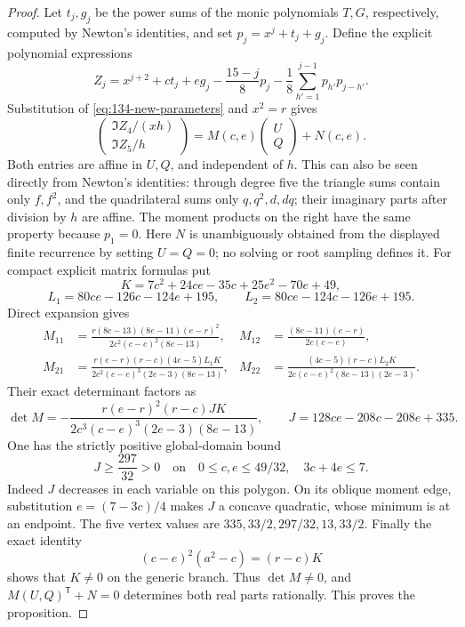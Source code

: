 \documentclass[11pt,a4paper]{article}
\theoremstyle{remark}
\begin{document}
\begin{proof}
Let \(t_j,g_j\) be the power sums of the monic polynomials \(T,G\),
respectively, computed by Newton's identities, and set
\(p_j=x^j+t_j+g_j\). Define the explicit polynomial expressions
\[
 Z_j=x^{j+2}+ct_j+eg_j-\frac{15-j}{8}p_j
                  -\frac18\sum_{h'=1}^{j-1}p_{h'}p_{j-h'}.
\]
Substitution of \eqref{eq:134-new-parameters} and \(x^2=r\) gives
\[
 \begin{pmatrix}\Im Z_4/(xh)\\\Im Z_5/h\end{pmatrix}
       =M(c,e)\begin{pmatrix}U\\Q\end{pmatrix}+N(c,e).
\]
Both entries are affine in \(U,Q\), and independent of \(h\).
This can also be seen directly from Newton's identities: through
degree five the triangle sums contain only \(f,f^2\), and the
quadrilateral sums only \(q,q^2,d,dq\); their imaginary parts after
division by \(h\) are affine. The moment products on the right have
the same property because \(p_1=0\).
Here \(N\) is unambiguously obtained from the displayed finite
recurrence by setting \(U=Q=0\); no solving or root sampling defines
it. For compact explicit matrix formulas put
\[
 K=7c^2+24ce-35c+25e^2-70e+49,
\]
\[
 L_1=80ce-126c-124e+195,\qquad
 L_2=80ce-124c-126e+195.
\]
Direct expansion gives
\begin{align*}
 M_{11}&=\frac{r(8c-13)(8e-11)(e-r)^2}
                    {2c^2(c-e)^2(8e-13)},&
 M_{12}&=\frac{(8c-11)(e-r)}{2c(c-e)},\\
 M_{21}&=\frac{r(e-r)(r-c)(4e-5)L_1K}
                  {2c^2(c-e)^3(2e-3)(8e-13)},&
 M_{22}&=\frac{(4c-5)(r-c)L_2K}
                  {2c(c-e)^2(8c-13)(2e-3)}.
\end{align*}
Their exact determinant factors as
\begin{equation}\label{eq:134-new-determinant}
 \det M=-\frac{r(e-r)^2(r-c)JK}
               {2c^3(c-e)^3(2e-3)(8e-13)},\qquad
 J=128ce-208c-208e+335.
\end{equation}
One has the strictly positive global-domain bound
\[
 J\ge\frac{297}{32}>0
 \quad\text{on}\quad
 0\le c,e\le49/32,\quad 3c+4e\le7.
\]
Indeed \(J\) decreases in each variable on this polygon. On its
oblique moment edge, substitution \(e=(7-3c)/4\) makes \(J\) a
concave quadratic, whose minimum is at an endpoint. The five vertex
values are \(335,33/2,297/32,13,33/2\).
Finally the exact identity
\[
 (c-e)^2(a^2-c)=(r-c)K
\]
shows that \(K\ne0\) on the generic branch. Thus \(\det M\ne0\),
and \(M(U,Q)^{\mathsf T}+N=0\) determines both real parts rationally.
This proves the proposition.
\end{proof}
\end{document}
